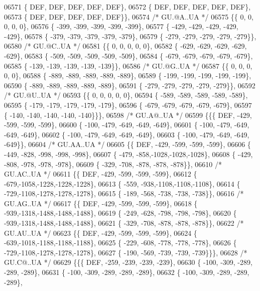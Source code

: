 \begin{DoxyCode}
06571 \{  DEF,  DEF,  DEF,  DEF,  DEF\},
06572 \{  DEF,  DEF,  DEF,  DEF,  DEF\},
06573 \{  DEF,  DEF,  DEF,  DEF,  DEF\}\},
06574 \textcolor{comment}{/* GU.@A..UA */}
06575 \{\{    0,    0,    0,    0,    0\},
06576 \{ -399, -399, -399, -399, -399\},
06577 \{ -429, -429, -429, -429, -429\},
06578 \{ -379, -379, -379, -379, -379\},
06579 \{ -279, -279, -279, -279, -279\}\},
06580 \textcolor{comment}{/* GU.@C..UA */}
06581 \{\{    0,    0,    0,    0,    0\},
06582 \{ -629, -629, -629, -629, -629\},
06583 \{ -509, -509, -509, -509, -509\},
06584 \{ -679, -679, -679, -679, -679\},
06585 \{ -139, -139, -139, -139, -139\}\},
06586 \textcolor{comment}{/* GU.@G..UA */}
06587 \{\{    0,    0,    0,    0,    0\},
06588 \{ -889, -889, -889, -889, -889\},
06589 \{ -199, -199, -199, -199, -199\},
06590 \{ -889, -889, -889, -889, -889\},
06591 \{ -279, -279, -279, -279, -279\}\},
06592 \textcolor{comment}{/* GU.@U..UA */}
06593 \{\{    0,    0,    0,    0,    0\},
06594 \{ -589, -589, -589, -589, -589\},
06595 \{ -179, -179, -179, -179, -179\},
06596 \{ -679, -679, -679, -679, -679\},
06597 \{ -140, -140, -140, -140, -140\}\}\},
06598 \textcolor{comment}{/* GU.A@..UA */}
06599 \{\{\{  DEF, -429, -599, -599, -599\},
06600 \{ -100, -479, -649, -649, -649\},
06601 \{ -100, -479, -649, -649, -649\},
06602 \{ -100, -479, -649, -649, -649\},
06603 \{ -100, -479, -649, -649, -649\}\},
06604 \textcolor{comment}{/* GU.AA..UA */}
06605 \{\{  DEF, -429, -599, -599, -599\},
06606 \{ -449, -828, -998, -998, -998\},
06607 \{ -479, -858,-1028,-1028,-1028\},
06608 \{ -429, -808, -978, -978, -978\},
06609 \{ -329, -708, -878, -878, -878\}\},
06610 \textcolor{comment}{/* GU.AC..UA */}
06611 \{\{  DEF, -429, -599, -599, -599\},
06612 \{ -679,-1058,-1228,-1228,-1228\},
06613 \{ -559, -938,-1108,-1108,-1108\},
06614 \{ -729,-1108,-1278,-1278,-1278\},
06615 \{ -189, -568, -738, -738, -738\}\},
06616 \textcolor{comment}{/* GU.AG..UA */}
06617 \{\{  DEF, -429, -599, -599, -599\},
06618 \{ -939,-1318,-1488,-1488,-1488\},
06619 \{ -249, -628, -798, -798, -798\},
06620 \{ -939,-1318,-1488,-1488,-1488\},
06621 \{ -329, -708, -878, -878, -878\}\},
06622 \textcolor{comment}{/* GU.AU..UA */}
06623 \{\{  DEF, -429, -599, -599, -599\},
06624 \{ -639,-1018,-1188,-1188,-1188\},
06625 \{ -229, -608, -778, -778, -778\},
06626 \{ -729,-1108,-1278,-1278,-1278\},
06627 \{ -190, -569, -739, -739, -739\}\}\},
06628 \textcolor{comment}{/* GU.C@..UA */}
06629 \{\{\{  DEF, -259, -239, -239, -239\},
06630 \{ -100, -309, -289, -289, -289\},
06631 \{ -100, -309, -289, -289, -289\},
06632 \{ -100, -309, -289, -289, -289\},

\end{DoxyCode}
